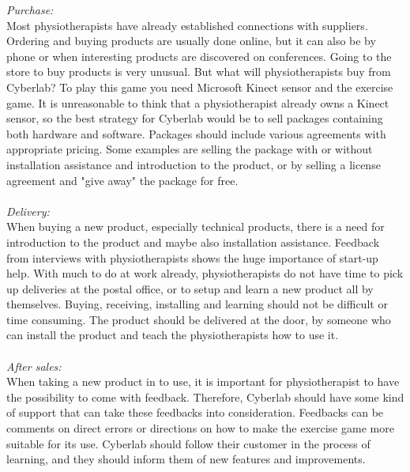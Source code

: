 \emph{Purchase:} \\
Most physiotherapists have already established connections with suppliers. Ordering and buying products are usually done online, but it can also be by phone or when interesting products are discovered on conferences. Going to the store to buy products is very unusual. But what will physiotherapists buy from Cyberlab? To play this game you need Microsoft Kinect sensor and the exercise game. It is unreasonable to think that a physiotherapist already owns a Kinect sensor, so the best strategy for Cyberlab would be to sell packages containing both hardware and software.  Packages should include various agreements with appropriate pricing. Some examples are selling the package with or without installation assistance and introduction to the product, or by selling a license agreement and "give away" the package for free.\\ \\
\emph{Delivery:}\\
When buying a new product, especially technical products, there is a need for introduction to the product and maybe also installation assistance. Feedback from interviews with physiotherapists shows the huge importance of start-up help. With much to do at work already, physiotherapists do not have time to pick up deliveries at the postal office, or to setup and learn a new product all by themselves. Buying, receiving, installing and learning should not be difficult or time consuming. The product should be delivered at the door, by someone who can install the product and teach the physiotherapists how to use it.\\ \\
\emph{After sales:}\\
When taking a new product in to use, it is important for physiotherapist to have the possibility to come with feedback. Therefore, Cyberlab should have some kind of support that can take these feedbacks into consideration. Feedbacks can be comments on direct errors or directions on how to make the exercise game more suitable for its use. Cyberlab should follow their customer in the process of learning, and they should inform them of new features and improvements.  

